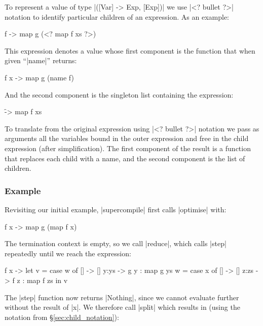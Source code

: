 \documentclass[draft]{sigplanconf}
\begin{document}
To represent a value of type |([Var] -> Exp, [Exp])| we use |<? bullet ?>| notation to identify particular children of an expression. As an example:

\begin{code}
\g f -> map g (<? map f xs ?>)
\end{code}

\noindent This expression denotes a value whose first component is the function that when given ``|name|'' returns:

\begin{code}
\g f x -> map g (name f)
\end{code}

\noindent And the second component is the singleton list containing the expression:

\begin{code}
\f -> map f xs
\end{code}

To translate from the original expression using |<? bullet ?>| notation we pass as arguments all the variables bound in the outer expression and free in the child expression (after simplification). The first component of the result is a function that replaces each child with a name, and the second component is the list of children.

\subsubsection{Example}
\label{sec:manager_example}

Revisiting our initial example, |supercompile| first calls |optimise| with:

\begin{code}
\g f x -> map g (map f x)
\end{code}

The termination context is empty, so we call |reduce|, which calls |step| repeatedly until we reach the expression:

\begin{code}
\g f x ->  let  v = case  w of
                          []    -> []
                          y:ys  -> g y : map g ys
                w = case  x of
                          []    -> []
                          z:zs  -> f z : map f zs
           in   v
\end{code}

The |step| function now returns |Nothing|, since we cannot evaluate further without the result of |x|. We therefore call |split| which results in (using the notation from \S\ref{sec:child_notation}):
\end{document}
